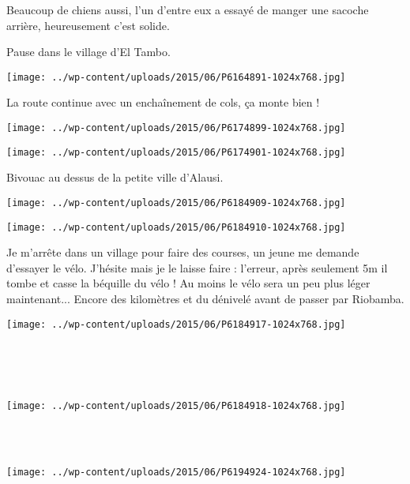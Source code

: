 Beaucoup de chiens aussi, l'un d'entre eux a essayé de manger une sacoche arrière, heureusement c'est solide.

Pause dans le village d'El Tambo. 
\begin{center} \texttt{[image: ../wp-content/uploads/2015/06/P6164891-1024x768.jpg]} \end{center}

La route continue avec un enchaînement de cols, ça monte bien ! 
\begin{center} \texttt{[image: ../wp-content/uploads/2015/06/P6174899-1024x768.jpg]} \end{center}
\begin{center} \texttt{[image: ../wp-content/uploads/2015/06/P6174901-1024x768.jpg]} \end{center}

Bivouac au dessus de la petite ville d'Alausi. 
\begin{center} \texttt{[image: ../wp-content/uploads/2015/06/P6184909-1024x768.jpg]} \end{center}
\begin{center} \texttt{[image: ../wp-content/uploads/2015/06/P6184910-1024x768.jpg]} \end{center}

Je m'arrête dans un village pour faire des courses, un jeune me demande d'essayer le vélo. J'hésite mais je le laisse faire : l'erreur, après seulement 5m il tombe et casse la béquille du vélo ! Au moins le vélo sera un peu plus léger maintenant...
Encore des kilomètres et du dénivelé avant de passer par Riobamba. 
\begin{center} \texttt{[image: ../wp-content/uploads/2015/06/P6184917-1024x768.jpg]} \end{center}
\vspace{-\topsep}
\pagebreak
~\\~\\~\\
\begin{center} \texttt{[image: ../wp-content/uploads/2015/06/P6184918-1024x768.jpg]} \end{center}
~\\~\\
\begin{center} \texttt{[image: ../wp-content/uploads/2015/06/P6194924-1024x768.jpg]} \end{center}
\vspace{-\topsep}
\pagebreak

